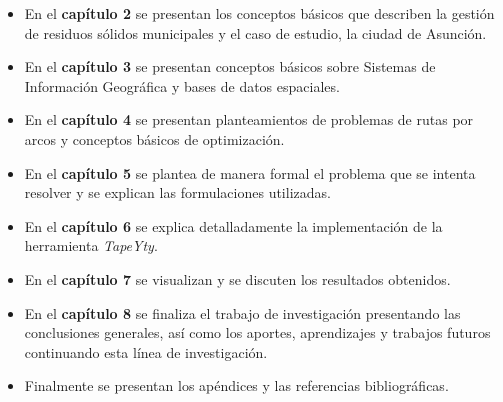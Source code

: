 \begin{itemize}
    \item En el \textbf{capítulo 2} se presentan los conceptos básicos que describen la gestión de residuos sólidos municipales y el caso de estudio, la ciudad de Asunción.
    \item En el \textbf{capítulo 3} se presentan conceptos básicos sobre Sistemas de Información Geográfica y bases de datos espaciales.
    \item En el \textbf{capítulo 4} se presentan planteamientos de problemas de rutas por arcos y conceptos básicos de optimización.
    \item En el \textbf{capítulo 5} se plantea de manera formal el problema que se intenta resolver y se explican las formulaciones utilizadas.
    \item En el \textbf{capítulo 6} se explica detalladamente la implementación de la herramienta \textit{TapeYty}. 
    \item En el \textbf{capítulo 7} se visualizan y se discuten los resultados obtenidos.
    \item En el \textbf{capítulo 8} se finaliza el trabajo de investigación presentando las conclusiones generales, así como los aportes, aprendizajes y trabajos futuros continuando esta línea de investigación.
    \item Finalmente se presentan los apéndices y las referencias bibliográficas.
\end{itemize}
